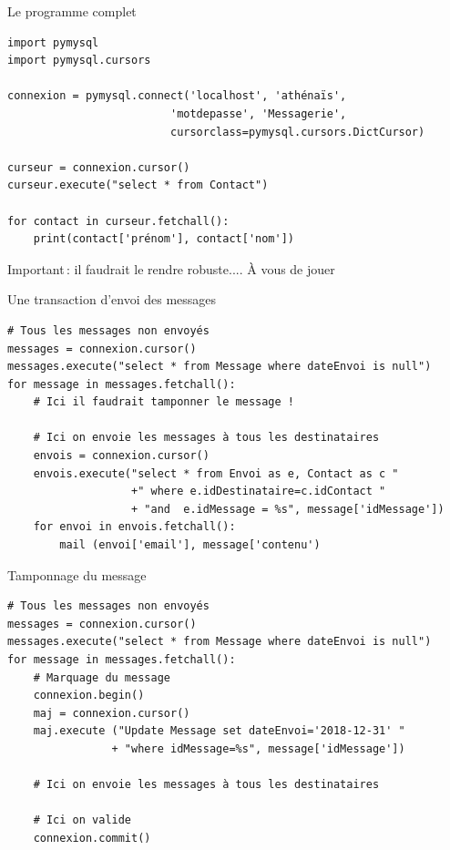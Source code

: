 \begin{frame}[fragile]{Le programme complet}

\begin{verbatim}
import pymysql
import pymysql.cursors

connexion = pymysql.connect('localhost', 'athénaïs', 
                         'motdepasse', 'Messagerie',
                         cursorclass=pymysql.cursors.DictCursor)

curseur = connexion.cursor()
curseur.execute("select * from Contact")

for contact in curseur.fetchall():
    print(contact['prénom'], contact['nom'])
\end{verbatim}
\vfill

\alert{Important}\,: il faudrait le rendre robuste.... À vous de jouer

\end{frame}

\begin{frame}[fragile]{Une transaction d'envoi des messages}

\begin{verbatim}
# Tous les messages non envoyés
messages = connexion.cursor()
messages.execute("select * from Message where dateEnvoi is null")
for message in messages.fetchall():
    # Ici il faudrait tamponner le message !
    
    # Ici on envoie les messages à tous les destinataires
    envois = connexion.cursor()
    envois.execute("select * from Envoi as e, Contact as c "
                   +" where e.idDestinataire=c.idContact "
                   + "and  e.idMessage = %s", message['idMessage'])
    for envoi in envois.fetchall():
        mail (envoi['email'], message['contenu')
\end{verbatim}

\end{frame}


\begin{frame}[fragile]{Tamponnage du message}

\begin{verbatim}
# Tous les messages non envoyés
messages = connexion.cursor()
messages.execute("select * from Message where dateEnvoi is null")
for message in messages.fetchall():
    # Marquage du message
    connexion.begin()
    maj = connexion.cursor()
    maj.execute ("Update Message set dateEnvoi='2018-12-31' "
                + "where idMessage=%s", message['idMessage'])
                
    # Ici on envoie les messages à tous les destinataires
               
    # Ici on valide
    connexion.commit()
\end{verbatim}

\end{frame}


